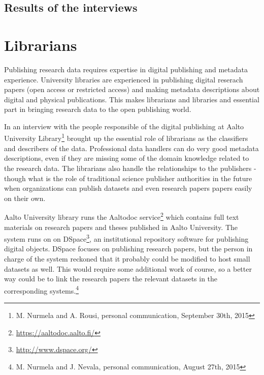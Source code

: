 \subsection{Results of the interviews}

\fi

\section{Librarians}

Publishing research data requires expertise in digital publishing and metadata
experience. University libraries are experienced in publishing digital reserach
papers (open access or restricted access) and making metadata descriptions
about digital and physical publications. This makes librarians and libraries
and essential part in bringing research data to the open publishing world.

In an interview with the people responsible of the digital publishing at Aalto
University Library\footnote{M. Nurmela and A. Rousi, personal
communication, September 30th, 2015} brought up the essential role of
librarians as the classifiers and describers of the data. Professional data
handlers can do very good metadata descriptions, even if they are missing
some of the domain knowledge related to the research data. The librarians
also handle the relationships to the publishers - though what is the role
of traditional science publisher authorities in the future when organizations
can publish datasets and even research papers papers easily on their own.

Aalto University library runs the Aaltodoc service\footnote{\url{https://aaltodoc.aalto.fi/}}
which contains full text materials on research papers and theses published
in Aalto University. The system runs on on DSpace\footnote{\url{http://www.dspace.org/}},
an institutional repository software for publishing digital objects. DSpace
focuses on publishing research papers, but the person in charge of the system
reckoned that it probably could be modified to host small datasets as well.
This would require some additional work of course, so a better way could be to
link the research papers the relevant datasets in the corresponding systems.\footnote{M.
Nurmela and J. Nevala, personal communication, August 27th, 2015}

